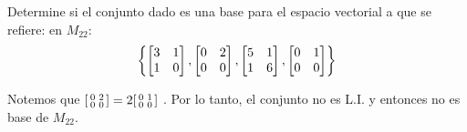 \begin{exercise}
	Determine si el conjunto dado es una base para el espacio vectorial a que se refiere: en $M_{22}$: 
	\[ \left\{ 
	\begin{bmatrix}
		3 & 1\\
		1 & 0
	\end{bmatrix},
	\begin{bmatrix}
		0 & 2\\
		0 & 0
	\end{bmatrix},
	\begin{bmatrix}
		5 & 1\\
		1 & 6
	\end{bmatrix},
	\begin{bmatrix}
		0 & 1\\
		0 & 0
	\end{bmatrix}
	 \right\} \]
\end{exercise}
\begin{solution}
	Notemos que
	$
		\begin{bsmallmatrix}
			0 & 2\\
			0 & 0
		\end{bsmallmatrix}
		=
		2
		\begin{bsmallmatrix}
			0 & 1\\
			0 & 0
		\end{bsmallmatrix}
	$
	. Por lo tanto, el conjunto no es L.I. y entonces no es base de $M_{22}$.
\end{solution}